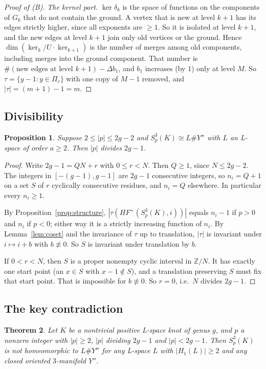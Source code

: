 \documentclass[11pt]{article}
\newtheorem{theorem}{Theorem}[section]
\newtheorem{proposition}[theorem]{Proposition}
\theoremstyle{definition}
\newcommand{\Z}{\mathbb{Z}}
\newcommand{\HFp}{\mathit{HF}^+}
\begin{document}
\begin{proof}[Proof of (B)]
\emph{The kernel part.} $\ker\delta_k$ is the space of functions on the components of $G_k$ that do not contain the ground. A vertex that is new at level $k+1$ has its edges strictly higher, since all exponents are $\ge1$. So it is isolated at level $k+1$, and the new edges at level $k+1$ join only old vertices or the ground. Hence $\dim(\ker_k/U\cdot\ker_{k+1})$ is the number of merges among old components, including merges into the ground component. That number is $\#(\text{new edges at level }k+1)-\Delta b_1$, and $b_1$ increases (by $1$) only at level $M$. So $\tau=\{y-1:y\in\Pi_c\}$ with one copy of $M-1$ removed, and $|\tau|=(m+1)-1=m$.
\end{proof}

\subsection{Divisibility}

\begin{proposition}\label{prop:divis}
Suppose $2\le|p|\le2g-2$ and $S^3_p(K)\cong L\#Y''$ with $L$ an L-space of order $a\ge2$. Then $|p|$ divides $2g-1$.
\end{proposition}

\begin{proof}
Write $2g-1=QN+r$ with $0\le r<N$. Then $Q\ge1$, since $N\le2g-2$. The integers in $[-(g-1),g-1]$ are $2g-1$ consecutive integers, so $n_i=Q+1$ on a set $S$ of $r$ cyclically consecutive residues, and $n_i=Q$ elsewhere. In particular every $n_i\ge1$.

By Proposition~\ref{prop:structure}, $|\tau(\HFp(S^3_p(K),i))|$ equals $n_i-1$ if $p>0$ and $n_i$ if $p<0$; either way it is a strictly increasing function of $n_i$. By Lemma~\ref{lem:coset} and the invariance of $\tau$ up to translation, $|\tau|$ is invariant under $i\mapsto i+b$ with $b\not\equiv0$. So $S$ is invariant under translation by $b$.

If $0<r<N$, then $S$ is a proper nonempty cyclic interval in $\Z/N$. It has exactly one start point (an $x\in S$ with $x-1\notin S$), and a translation preserving $S$ must fix that start point. That is impossible for $b\not\equiv0$. So $r=0$, i.e.\ $N$ divides $2g-1$.
\end{proof}

\subsection{The key contradiction}

\begin{theorem}\label{thm:key}
Let $K$ be a nontrivial positive L-space knot of genus $g$, and $p$ a nonzero integer with $|p|\ge2$, $|p|$ dividing $2g-1$ and $|p|<2g-1$. Then $S^3_p(K)$ is not homeomorphic to $L\#Y''$ for any L-space $L$ with $|H_1(L)|\ge2$ and any closed oriented $3$-manifold $Y''$.
\end{theorem}
\end{document}
